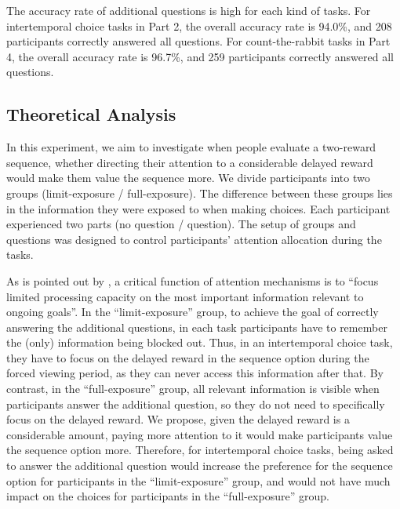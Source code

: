 \documentclass[
  12pt,
]{article}
\begin{document}
The accuracy rate of additional questions is high for each kind of
tasks. For intertemporal choice tasks in Part 2, the overall accuracy
rate is 94.0\%, and 208 participants correctly answered all questions.
For count-the-rabbit tasks in Part 4, the overall accuracy rate is
96.7\%, and 259 participants correctly answered all questions.

\hypertarget{theoretical-analysis}{%
\subsection{Theoretical Analysis}\label{theoretical-analysis}}

In this experiment, we aim to investigate when people evaluate a
two-reward sequence, whether directing their attention to a considerable
delayed reward would make them value the sequence more. We divide
participants into two groups (limit-exposure / full-exposure). The
difference between these groups lies in the information they were
exposed to when making choices. Each participant experienced two parts
(no question / question). The setup of groups and questions was designed
to control participants' attention allocation during the tasks.

As is pointed out by \citet{chun2011taxonomy}, a critical function of
attention mechanisms is to ``focus limited processing capacity on the
most important information relevant to ongoing goals''. In the
``limit-exposure'' group, to achieve the goal of correctly answering the
additional questions, in each task participants have to remember the
(only) information being blocked out. Thus, in an intertemporal choice
task, they have to focus on the delayed reward in the sequence option
during the forced viewing period, as they can never access this
information after that. By contrast, in the ``full-exposure'' group, all
relevant information is visible when participants answer the additional
question, so they do not need to specifically focus on the delayed
reward. We propose, given the delayed reward is a considerable amount,
paying more attention to it would make participants value the sequence
option more. Therefore, for intertemporal choice tasks, being asked to
answer the additional question would increase the preference for the
sequence option for participants in the ``limit-exposure'' group, and
would not have much impact on the choices for participants in the
``full-exposure'' group.
\end{document}

